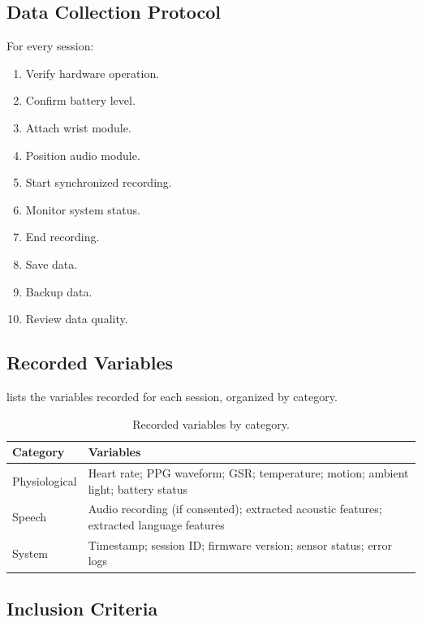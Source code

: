 \subsection{Data Collection Protocol}
\label{sec:data-collection-protocol}

For every session:
\begin{enumerate}
    \item Verify hardware operation.
    \item Confirm battery level.
    \item Attach wrist module.
    \item Position audio module.
    \item Start synchronized recording.
    \item Monitor system status.
    \item End recording.
    \item Save data.
    \item Backup data.
    \item Review data quality.
\end{enumerate}

\subsection{Recorded Variables}
\label{sec:recorded-variables}

 lists the variables recorded for each session, organized by category.

\begin{table}[H]
\centering
\caption{Recorded variables by category.}
\label{tab:recorded-variables}
\small
\begin{tabularx}{\columnwidth}{@{}l Y@{}}
\toprule
\textbf{Category} & \textbf{Variables} \\
\midrule
Physiological & Heart rate; PPG waveform; GSR; temperature; motion; ambient light; battery status \\
Speech & Audio recording (if consented); extracted acoustic features; extracted language features \\
System & Timestamp; session ID; firmware version; sensor status; error logs \\
\bottomrule
\end{tabularx}
\end{table}

\subsection{Inclusion Criteria}
\label{sec:inclusion-criteria}

